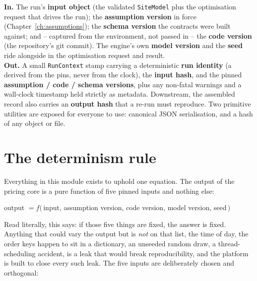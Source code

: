 \begin{contract}
\textbf{In.} The run's \textbf{input object} (the validated \texttt{SiteModel} plus the optimisation request that drives the run); the \textbf{assumption version} in force (Chapter~\ref{ch:assumptions}); the \textbf{schema version} the contracts were built against; and -- captured from the environment, not passed in -- the \textbf{code version} (the repository's git commit). The engine's own \textbf{model version} and the \textbf{seed} ride alongside in the optimisation request and result.\\
\textbf{Out.} A small \texttt{RunContext} stamp carrying a deterministic \textbf{run identity} (a  derived from the pins, never from the clock), the \textbf{input hash}, and the pinned \textbf{assumption / code / schema versions}, plus any non-fatal warnings and a wall-clock timestamp held strictly as metadata. Downstream, the assembled record also carries an \textbf{output hash} that a re-run must reproduce. Two primitive utilities are exposed for everyone to use: canonical JSON serialisation, and a hash of any object or file.
\end{contract}

\section{The determinism rule}

Everything in this module exists to uphold one equation. The output of the pricing core is a pure function of five pinned inputs and nothing else:

\begin{center}\sffamily
output $= f($\,input,\; assumption version,\; code version,\; model version,\; seed\,$)$
\end{center}

Read literally, this says: if those five things are fixed, the answer is fixed. Anything that could vary the output but is \emph{not} on that list, the time of day, the order keys happen to sit in a dictionary, an unseeded random draw, a thread-scheduling accident, is a leak that would break reproducibility, and the platform is built to close every such leak. The five inputs are deliberately chosen and orthogonal:

